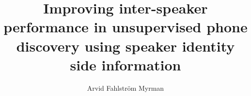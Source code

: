 \documentclass[11pt]{report}
\title{Improving inter-speaker performance in unsupervised phone discovery using speaker identity side information}
\author{Arvid Fahlström Myrman}
\begin{document}
\titlepage







\printbibliography
\end{document}
